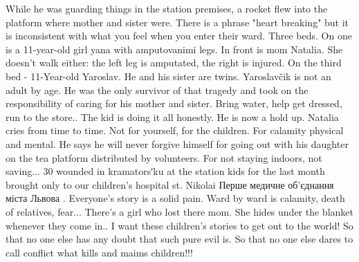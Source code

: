  
 
 
 
 

While he was guarding things in the station premises, a rocket flew into the platform where mother and sister were.
There is a phrase "heart breaking" but it is inconsistent with what you feel when you enter their ward. Three beds. On one is a 11-year-old girl yana with amputovanimi legs. In front is mom Natalia. She doesn't walk either: the left leg is amputated, the right is injured. On the third bed - 11-Year-old Yaroslav. He and his sister are twins.
Yaroslavčik is not an adult by age. He was the only survivor of that tragedy and took on the responsibility of caring for his mother and sister. Bring water, help get dressed, run to the store.. The kid is doing it all honestly. He is now a hold up.
Natalia cries from time to time. Not for yourself, for the children. For calamity physical and mental. He says he will never forgive himself for going out with his daughter on the tea platform distributed by volunteers. For not staying indoors, not saving...
30 wounded in kramatorsʹku at the station kids for the last month brought only to our children's hospital st. Nikolai Перше медичне об'єднання міста Львова . Everyone's story is a solid pain. Ward by ward is calamity, death of relatives, fear... There's a girl who lost there mom. She hides under the blanket whenever they come in..
I want these children’s stories to get out to the world! So that no one else has any doubt that such pure evil is. So that no one else dares to call conflict what kills and maims children!!!

